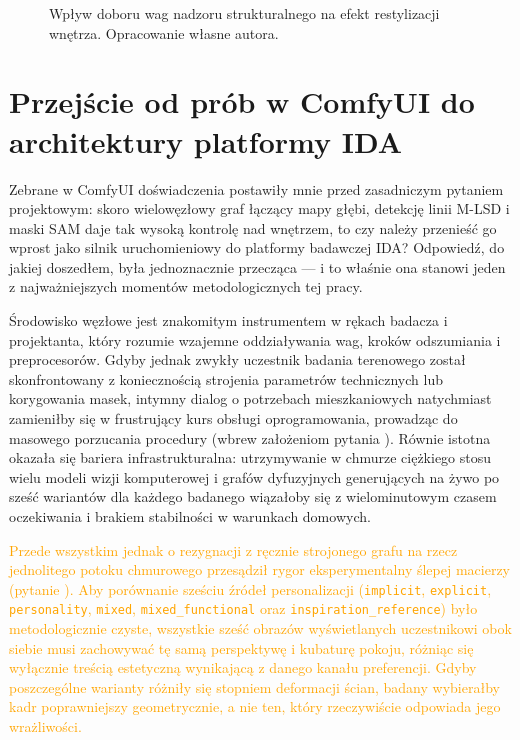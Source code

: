 \begin{figure}[htbp]
  \centering
  \caption{Wpływ doboru wag nadzoru strukturalnego na efekt restylizacji wnętrza.
  Opracowanie własne autora.}
  \label{fig:ch04:model-comparison}
\end{figure}

\section{Przejście od prób w ComfyUI do architektury platformy IDA}
\label{ch04:sec:most-ida}

Zebrane w ComfyUI doświadczenia postawiły mnie przed zasadniczym pytaniem projektowym: skoro wielowęzłowy graf łączący mapy głębi, detekcję linii M-LSD i maski SAM daje tak wysoką kontrolę nad wnętrzem, to czy należy przenieść go wprost jako silnik uruchomieniowy do platformy badawczej IDA? Odpowiedź, do jakiej doszedłem, była jednoznacznie przecząca --- i to właśnie ona stanowi jeden z najważniejszych momentów metodologicznych tej pracy.

Środowisko węzłowe jest znakomitym instrumentem w rękach badacza i projektanta, który rozumie wzajemne oddziaływania wag, kroków odszumiania i preprocesorów. Gdyby jednak zwykły uczestnik badania terenowego został skonfrontowany z koniecznością strojenia parametrów technicznych lub korygowania masek, intymny dialog o potrzebach mieszkaniowych natychmiast zamieniłby się w frustrujący kurs obsługi oprogramowania, prowadząc do masowego porzucania procedury (wbrew założeniom pytania ). Równie istotna okazała się bariera infrastrukturalna: utrzymywanie w chmurze ciężkiego stosu wielu modeli wizji komputerowej i grafów dyfuzyjnych generujących na żywo po sześć wariantów dla każdego badanego wiązałoby się z wielominutowym czasem oczekiwania i brakiem stabilności w warunkach domowych.

\textcolor{orange}{Przede wszystkim jednak o rezygnacji z ręcznie strojonego grafu na rzecz jednolitego potoku chmurowego przesądził rygor eksperymentalny ślepej macierzy (pytanie ). Aby porównanie sześciu źródeł personalizacji (\texttt{implicit}, \texttt{explicit}, \texttt{personality}, \texttt{mixed}, \texttt{mixed\_functional} oraz \texttt{inspiration\_reference}) było metodologicznie czyste, wszystkie sześć obrazów wyświetlanych uczestnikowi obok siebie musi zachowywać tę samą perspektywę i kubaturę pokoju, różniąc się wyłącznie treścią estetyczną wynikającą z danego kanału preferencji. Gdyby poszczególne warianty różniły się stopniem deformacji ścian, badany wybierałby kadr poprawniejszy geometrycznie, a nie ten, który rzeczywiście odpowiada jego wrażliwości.}

